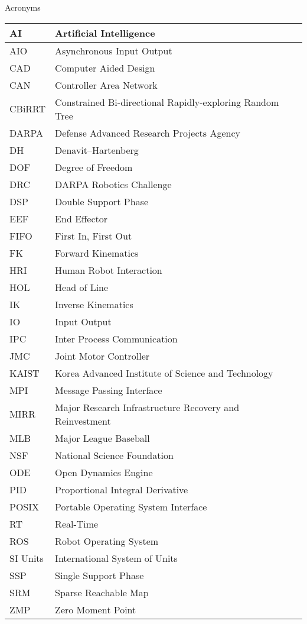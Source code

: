 \Large
\centering
Acronyms\\
\normalsize
\begin{longtable}{l | l}
\hline
AI & Artificial Intelligence\\
\hline
AIO & Asynchronous Input Output\\
\hline
CAD & Computer Aided Design\\
\hline
CAN & Controller Area Network \\
\hline
CBiRRT & Constrained Bi-directional Rapidly-exploring Random Tree\\
\hline
DARPA  &  Defense Advanced Research Projects Agency\\
\hline 
DH & Denavit–Hartenberg \\
\hline
DOF & Degree of Freedom \\
\hline
DRC  & DARPA Robotics Challenge \\
\hline
DSP & Double Support Phase\\
\hline
EEF  & End Effector\\
\hline
FIFO & First In, First Out\\
\hline
FK & Forward Kinematics\\
\hline
HRI & Human Robot Interaction\\
\hline
HOL & Head of Line\\
\hline
IK & Inverse Kinematics\\ 
\hline
IO & Input Output\\
\hline
IPC & Inter Process Communication \\
\hline
JMC & Joint Motor Controller\\
\hline
KAIST & Korea Advanced Institute of Science and Technology \\
\hline
MPI & Message Passing Interface\\
\hline
MIRR & Major Research Infrastructure Recovery and Reinvestment\\
\hline
MLB & Major League Baseball\\
\hline
NSF & National Science Foundation \\
\hline
ODE & Open Dynamics Engine\\
\hline
PID & Proportional Integral Derivative\\
\hline
POSIX & Portable Operating System Interface\\
\hline
RT & Real-Time\\
\hline
ROS & Robot Operating System\\
\hline
SI Units & International System of Units\\
\hline
SSP & Single Support Phase\\
\hline
SRM & Sparse Reachable Map \\
\hline 
ZMP & Zero Moment Point\\
\hline
\end{longtable}
